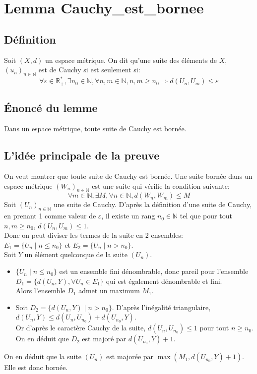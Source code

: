 
\section{Lemma Cauchy\_est\_bornee}
\subsection{Définition}
Soit $(X,d)$ un espace métrique. On dit qu'une suite des éléments de $X$, $(u_n)_{n\in \mathbb{N}}$ est de Cauchy si est seulement si: $$\forall \varepsilon \in \mathbb{R_+^*}, \exists n_0 \in \mathbb{N}, \forall n,m \in \mathbb{N}, n,m \geq n_0 \Rightarrow d(U_n,U_m) \leq \varepsilon$$ 
\subsection{\'Enoncé du lemme}
Dans un espace métrique, toute suite de Cauchy est bornée.

\subsection{L'idée principale de la preuve}
On veut montrer que toute suite de Cauchy est bornée. Une suite bornée dans un espace métrique $(W_n)_{n\in\mathbb{N}}$ est une suite qui vérifie la condition suivante:$$ \forall m \in \mathbb{N}, \exists M , \forall n \in \mathbb{N}, d(W_n,W_m)\leq M $$
Soit $(U_n)_{n\in\mathbb{N}}$ une suite de Cauchy.
D'après la définition d'une suite de Cauchy, en prenant 1 comme valeur de $\varepsilon$, il existe un rang $n_0 \in \mathbb{N}$ tel que pour tout $n,m \geq n_0$, $d(U_n,U_m)\leq 1$.\\ Donc on peut diviser les termes de la suite en 2 ensembles: \\ $E_1=\big\{U_n\mid n\leq n_0 \big\}$ et $E_2=\big\{U_n\mid n > n_0 \big\}$. \\
Soit $Y$ un élément quelconque de la suite $(U_n)$.
\begin{itemize}
    \item $\big\{U_n\mid n\leq n_0 \big\}$ est un ensemble fini dénombrable, donc pareil pour l'ensemble $D_1=\big\{d(U_n,Y), \forall U_n\in E_1\big\}$ qui est également dénombrable et fini.\\ Alors l'ensemble $D_1$ admet un maximum $M_1$.
    \item Soit $D_2=\big\{d(U_n,Y)\mid n> n_0 \big\}$. D'après l'inégalité triangulaire, $d(U_n,Y)\leq d(U_n,U_{n_0})+d(U_{n_0},Y)$.\\ Or d'après le caractère Cauchy de la suite, $d(U_n,U_{n_0})\leq 1$ pour tout $n\geq n_0$.\\ On en déduit que $D_2$ est majoré par $d(U_{n_0},Y)+1$. 
\end{itemize}
On en déduit que la suite $(U_n)$ est majorée par $\max(M_1,d(U_{n_0},Y)+1)$. Elle est donc bornée.\\


